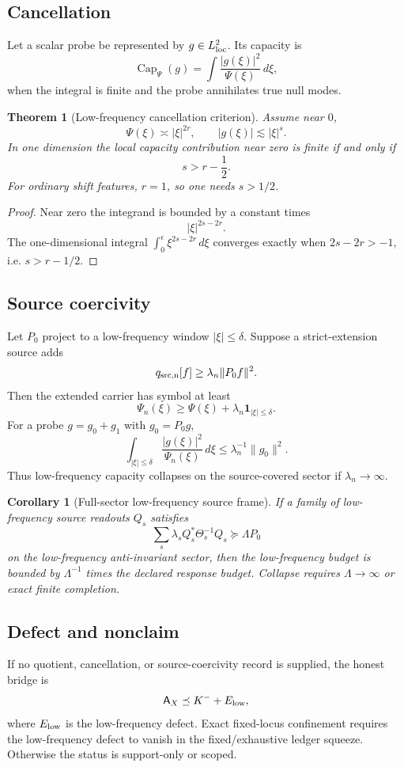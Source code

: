 \documentclass[11pt]{article}
\newtheorem{theorem}{Theorem}
\newtheorem{corollary}{Corollary}
\newcommand{\A}{\mathsf A}
\newcommand{\Cap}{\operatorname{Cap}}
\begin{document}
\subsection{Cancellation}
Let a scalar probe be represented by \(g\in L^2_{\rm loc}\).  Its capacity is
\[
\Cap_\Psi(g)=\int \frac{|g(\xi)|^2}{\Psi(\xi)}\,d\xi,
\]
when the integral is finite and the probe annihilates true null modes.

\begin{theorem}[Low-frequency cancellation criterion]
Assume near \(0\),
\[
\Psi(\xi)\asymp |\xi|^{2r},
\qquad
|g(\xi)|\lesssim |\xi|^s.
\]
In one dimension the local capacity contribution near zero is finite if and only if
\[
\boxed{s>r-\frac12.}
\]
For ordinary shift features, \(r=1\), so one needs \(s>1/2\).
\end{theorem}

\begin{proof}
Near zero the integrand is bounded by a constant times
\[
|\xi|^{2s-2r}.
\]
The one-dimensional integral \(\int_0^\epsilon \xi^{2s-2r}\,d\xi\) converges exactly when \(2s-2r>-1\), i.e. \(s>r-1/2\).
\end{proof}

\subsection{Source coercivity}
Let \(P_0\) project to a low-frequency window \(|\xi|\le\delta\).  Suppose a strict-extension source adds
\[
q_{\rm src,n}[f]\ge \lambda_n\|P_0f\|^2.
\]
Then the extended carrier has symbol at least
\[
\Psi_n(\xi)\ge \Psi(\xi)+\lambda_n\mathbf 1_{|\xi|\le\delta}.
\]
For a probe \(g=g_0+g_1\) with \(g_0=P_0g\),
\[
\int_{|\xi|\le\delta}\frac{|g(\xi)|^2}{\Psi_n(\xi)}\,d\xi\le \lambda_n^{-1}\|g_0\|^2.
\]
Thus low-frequency capacity collapses on the source-covered sector if \(\lambda_n\to\infty\).

\begin{corollary}[Full-sector low-frequency source frame]
If a family of low-frequency source readouts \(Q_s\) satisfies
\[
\sum_s\lambda_s Q_s^*\Theta_s^{-1}Q_s\succeq \Lambda P_0
\]
on the low-frequency anti-invariant sector, then the low-frequency budget is bounded by \(\Lambda^{-1}\) times the declared response budget.  Collapse requires \(\Lambda\to\infty\) or exact finite completion.
\end{corollary}

\subsection{Defect and nonclaim}
If no quotient, cancellation, or source-coercivity record is supplied, the honest bridge is
\[
\A_X\preceq K^-+E_{\rm low},
\]
where \(E_{\rm low}\) is the low-frequency defect.  Exact fixed-locus confinement requires the low-frequency defect to vanish in the fixed/exhaustive ledger squeeze.  Otherwise the status is support-only or scoped.
\end{document}

